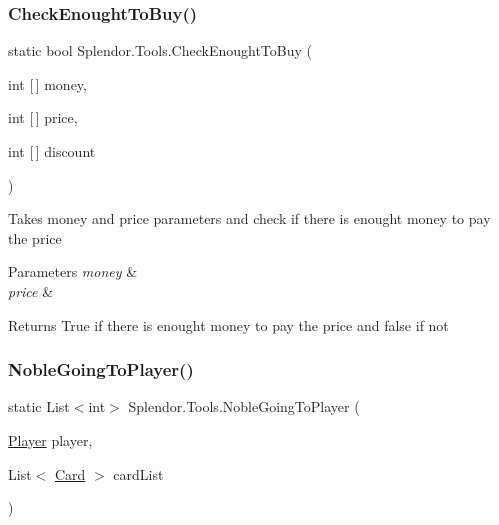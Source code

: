 \subsubsection{\texorpdfstring{Check\+Enought\+To\+Buy()}{CheckEnoughtToBuy()}}
{\footnotesize\ttfamily static bool Splendor.\+Tools.\+Check\+Enought\+To\+Buy (\begin{DoxyParamCaption}\item[{int \mbox{[}$\,$\mbox{]}}]{money,  }\item[{int \mbox{[}$\,$\mbox{]}}]{price,  }\item[{int \mbox{[}$\,$\mbox{]}}]{discount }\end{DoxyParamCaption})\hspace{0.3cm}{\ttfamily [static]}}



Takes money and price parameters and check if there is enought money to pay the price 


\begin{DoxyParams}{Parameters}
{\em money} & \\
\hline
{\em price} & \\
\hline
\end{DoxyParams}
\begin{DoxyReturn}{Returns}
True if there is enought money to pay the price and false if not
\end{DoxyReturn}
\mbox{\label{class_splendor_1_1_tools_ae21a6482f43b55bbcc38253d4f007da2}} 
\subsubsection{\texorpdfstring{Noble\+Going\+To\+Player()}{NobleGoingToPlayer()}}
{\footnotesize\ttfamily static List$<$int$>$ Splendor.\+Tools.\+Noble\+Going\+To\+Player (\begin{DoxyParamCaption}\item[{\hyperlink{class_splendor_1_1_player}{Player}}]{player,  }\item[{List$<$ \hyperlink{class_splendor_1_1_card}{Card} $>$}]{card\+List }\end{DoxyParamCaption})\hspace{0.3cm}{\ttfamily [static]}}



